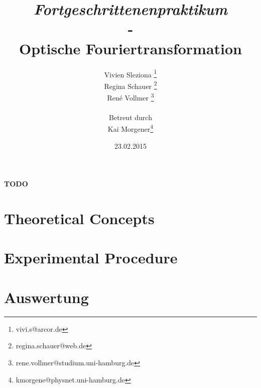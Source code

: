 \documentclass[10pt,a4paper]{article}
\begin{document}
	
	\textbf{TODO}
	
	
	
	\title{\textit{Fortgeschrittenenpraktikum}\\-\\Optische Fouriertransformation }
	\date{23.02.2015}
	\author{Vivien Sleziona \footnote{vivi.s@arcor.de}\\ Regina Schauer \footnote{regina.schauer@web.de}\\ René Vollmer \footnote{rene.vollmer@studium.uni-hamburg.de} \\ \\Betreut durch\\ Kai Morgener\footnote{kmorgene@physnet.uni-hamburg.de}}
	
	\maketitle
	
	\begin{center} 
		\bigskip
		\bigskip
		
		\begin{minipage}{0.75\textwidth}
			
		\end{minipage}
	\end{center}
	
	\newpage
	
	\tableofcontents
	\vfill
	\newpage
	\clearpage	
	
	
	\section{Theoretical Concepts}
	
	
	
	\newpage
	\clearpage
	
	\section{Experimental Procedure} %
	
	
	
	
	\newpage
	\clearpage
	
	\section{Auswertung}
	
	
\end{document}
